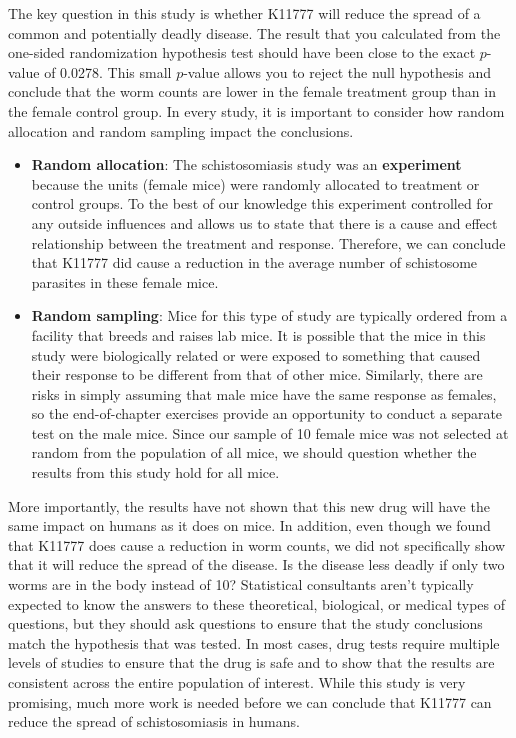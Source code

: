 \documentclass[
]{report}
\begin{document}
The key question in this study is whether K11777 will reduce the spread of a common and potentially deadly disease. The result that you calculated from the one-sided randomization hypothesis test should have been close to the exact \(\scriptstyle p\)-value of 0.0278. This small \(\scriptstyle p\)-value allows you to reject the null hypothesis and conclude that the worm counts are lower in the female treatment group than in the female control group. In every study, it is important to consider how random allocation and random sampling impact the conclusions.

\begin{itemize}
\item  {\textbf{Random allocation}: The schistosomiasis study was an \textbf{experiment} because the units (female mice) were randomly allocated to treatment or control groups. To the best of our knowledge this experiment controlled for any outside influences and allows us to state that there is a cause and effect relationship between the treatment and response. Therefore, we can conclude that K11777 did cause a reduction in the average number of schistosome parasites in these female mice.}

\item {\textbf{Random sampling}: Mice for this type of study are typically ordered from a facility that breeds and raises lab mice. It is possible that the mice in this study were biologically related or were exposed to something that caused their response to be different from that of other mice. Similarly, there are risks in simply assuming that male mice have the same response as females, so the end-of-chapter exercises provide an opportunity to conduct a separate test on the male mice. Since our sample of 10 female mice was not selected at random from the population of all mice, we should question whether the results from this study hold for all mice.}
\end{itemize}

More importantly, the results have not shown that this new drug will have the same impact on humans as it does on mice. In addition, even though we found that K11777 does cause a reduction in worm counts, we did not specifically show that it will reduce the spread of the disease. Is the disease less deadly if only two worms are in the body instead of 10? Statistical consultants aren't typically expected to know the answers to these theoretical, biological, or medical types of questions, but they should ask questions to ensure that the study conclusions match the hypothesis that was tested. In most cases, drug tests require multiple levels of studies to ensure that the drug is safe and to show that the results are consistent across the entire population of interest. While this study is very promising, much more work is needed before we can conclude that K11777 can reduce the spread of schistosomiasis in humans.
\end{document}
